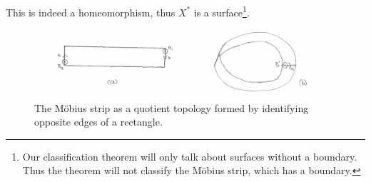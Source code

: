 \begin{exmp}
  This is indeed a homeomorphism, thus $X^*$ is
  a surface\footnote{Our classification theorem will only talk about
    surfaces without a boundary. Thus the theorem will not classify
    the M\"obius strip, which has a boundary.}.

  



  \begin{figure}[htbp]
  \centering
  \includegraphics[width=13.5cm]{mobius.png}
  \caption{The M\"obius strip as a quotient topology formed by
    identifying opposite edges of a rectangle.} 
  \label{fig:mobius}
\end{figure}
\end{exmp}

